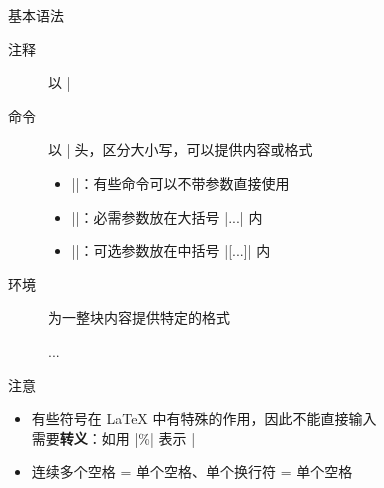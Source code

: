 \begin{frame}[fragile]{基本语法}
  \begin{description}
    \item[注释] 以 |%
    \item[命令] 以 |\| 开头，区分大小写，可以提供内容或格式
      \begin{itemize}
        \item |\foo|：有些命令可以不带参数直接使用
        \item ||：必需参数放在大括号 |{...}| 内
        \item ||：可选参数放在中括号 |[...]| 内
      \end{itemize}
    \item[环境] 为一整块内容提供特定的格式
      \begin{texcode}[gobble=8, emph={[1]env}]
        \begin{env}
          ...
        \end{env}
      \end{texcode}
  \end{description}
  \vspace{-1em}
  \begin{alertblock}{注意}
    \begin{itemize}
      \item 有些符号在 \LaTeX{} 中有特殊的作用，因此不能直接输入\\
            需要\textbf{转义}：如用 |\%| 表示 |%
      \item 连续多个空格 = 单个空格、单个换行符 = 单个空格
    \end{itemize}
  \end{alertblock}

\end{frame}

